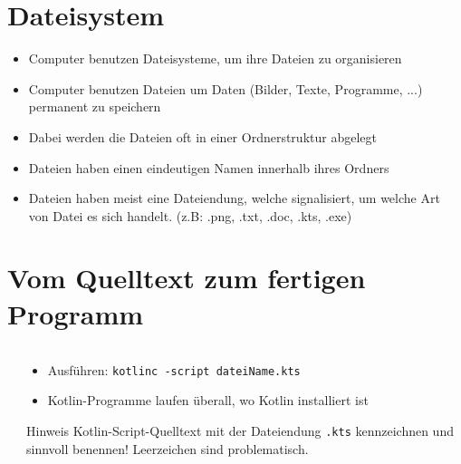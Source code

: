 \section{Dateisystem}
\begin{frame}
    \slidehead
    \begin{itemize}
        \item Computer benutzen Dateisysteme, um ihre Dateien zu organisieren
        \item Computer benutzen Dateien um Daten (Bilder, Texte, Programme, ...) permanent zu speichern
        \item Dabei werden die Dateien oft in einer Ordnerstruktur abgelegt
        \item Dateien haben einen eindeutigen Namen innerhalb ihres Ordners
        \item Dateien haben meist eine Dateiendung, welche signalisiert, um welche Art von Datei es sich handelt. (z.B: .png, .txt, .doc, .kts, .exe)
    \end{itemize}
\end{frame}

\section{Vom Quelltext zum fertigen Programm}
\begin{frame}
    \slidehead

    \begin{columns}[T]
        \begin{column}{.4\textwidth}
        \end{column}
        \begin{column}{.6\textwidth}
            \begin{itemize}
                \item Ausführen: \texttt{kotlinc -script dateiName.kts}
                \item Kotlin-Programme laufen überall, wo Kotlin installiert ist
            \end{itemize}
            \begin{block}{Hinweis}
                Kotlin-Script-Quelltext mit der Dateiendung \texttt{.kts} kennzeichnen und sinnvoll benennen! Leerzeichen sind problematisch.
            \end{block}
        \end{column}
    \end{columns}
\end{frame}

